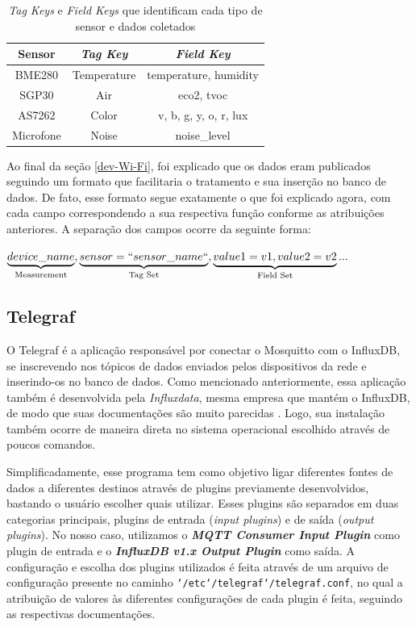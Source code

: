 \documentclass[../monografia.tex]{subfiles}
\begin{document}
\begin{table}[h!]
	\centering
	\begin{tabular}{|c|c|c|}
		\hline
		\textbf{Sensor} & \textit{\textbf{Tag Key}} & \textit{\textbf{Field Key}} \\ \hline
		BME280          & Temperature               & temperature, humidity       \\ \hline
		SGP30           & Air                       & eco2, tvoc                  \\ \hline
		AS7262          & Color                     & v, b, g, y, o, r, lux       \\ \hline
		Microfone       & Noise                     & noise\_level                \\ \hline
	\end{tabular}
	\caption{\textit{Tag Keys} e \textit{Field Keys} que identificam cada tipo de sensor e dados coletados}
	\label{table:tag-field-keys}
\end{table}

Ao final da seção \ref{dev-Wi-Fi}, foi explicado que os dados eram publicados seguindo um formato que facilitaria o tratamento e sua inserção no banco de dados. De fato, esse formato segue exatamente o que foi explicado agora, com cada campo correspondendo a sua respectiva função conforme as atribuições anteriores. A separação dos campos ocorre da seguinte forma:

\begin{center}
	$\underbrace{device\_name}_\text{Measurement},\underbrace{sensor=``sensor\_name``}_\text{Tag Set},\underbrace{value1=v1,value2=v2}_\text{Field Set}...$
\end{center}

\subsection{Telegraf}

O Telegraf é a aplicação responsável por conectar o Mosquitto com o InfluxDB, se inscrevendo nos tópicos de dados enviados pelos dispositivos da rede e inserindo-os no banco de dados. Como mencionado anteriormente, essa aplicação também é desenvolvida pela \textit{Influxdata}, mesma empresa que mantém o InfluxDB, de modo que suas documentações são muito parecidas \cite{telegraf-installation}. Logo, sua instalação também ocorre de maneira direta no sistema operacional escolhido através de poucos comandos. 

Simplificadamente, esse programa tem como objetivo ligar diferentes fontes de dados a diferentes destinos através de plugins previamente desenvolvidos, bastando o usuário escolher quais utilizar. Esses plugins são separados em duas categorias principais, plugins de entrada (\textit{input plugins}) e de saída (\textit{output plugins}). No nosso caso, utilizamos o \textit{\textbf{MQTT Consumer Input Plugin}} como plugin de entrada e o \textit{\textbf{InfluxDB v1.x Output Plugin}} como saída. A configuração e escolha dos plugins utilizados é feita através de um arquivo de configuração presente no caminho \texttt{\char`/etc\char`/telegraf\char`/telegraf.conf}, no qual a atribuição de valores às diferentes configurações de cada plugin é feita, seguindo as respectivas documentações. 
\end{document}
